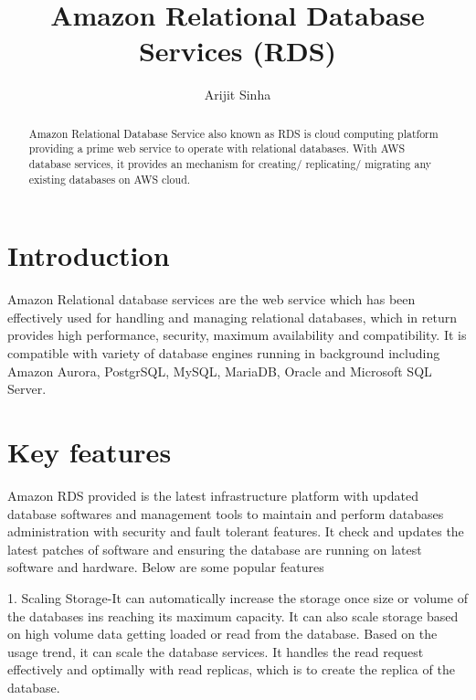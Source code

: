
\title{Amazon Relational Database Services (RDS)}

\author{Arijit Sinha}

\renewcommand{\shortauthors}{A.Sinha}

\begin{abstract}
Amazon Relational Database Service also known as RDS is cloud computing
platform providing a prime web service to operate with relational databases. 
With AWS database services, it provides an mechanism for 
creating/ replicating/ migrating any existing databases on AWS cloud.

\end{abstract}


\maketitle

\section{Introduction}
Amazon Relational database services are the web service which has been 
effectively used for  handling and managing relational databases, which 
in return provides high performance, security, maximum availability and 
compatibility. 
It is compatible with variety of database engines running in background 
including Amazon Aurora, PostgrSQL, MySQL, MariaDB, Oracle and 
Microsoft SQL Server.

\section{Key features}
Amazon RDS provided is the latest infrastructure platform with updated 
database softwares and management tools to maintain and perform databases 
administration with security and fault tolerant features. It check and updates the latest patches of software and ensuring the database are running on latest software and hardware.
Below are some popular features 

1. Scaling Storage-It can automatically increase the storage once size or 
volume of the databases ins reaching its maximum capacity. It can also 
scale storage based on high volume data getting loaded or read 
from the database. Based on the usage trend, it can scale the database services. It handles the read request effectively and optimally with read replicas, which is to create the replica of the database. 

